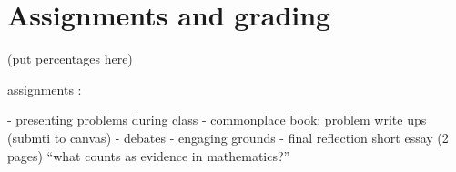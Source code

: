 \documentclass[oneside,11pt]{amsart}
\begin{document}
%
%
%
%
%
%
%
%
%
%
%
%
%
%
%
%
%
%
%
%
%
%
\section{Assignments and grading}

(put percentages here)

assignments :

- presenting problems during class
- commonplace book: problem write ups (submti to canvas)
- debates
- engaging grounds
- final reflection short essay (2 pages) ``what counts as evidence in mathematics?''
\end{document}
